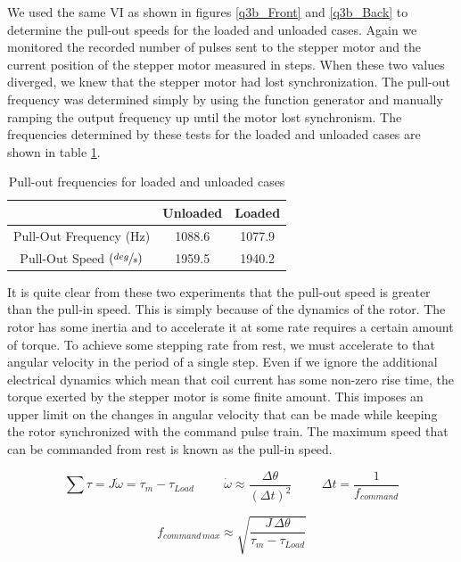 \documentclass{article}
\theoremstyle{plain}
\theoremstyle{definition}
\theoremstyle{remark}
\begin{document}
We used the same VI as shown in figures \ref{q3b_Front} and \ref{q3b_Back} to determine the pull-out speeds for the loaded and unloaded cases.  Again we monitored the recorded number of pulses sent to the stepper motor and the current position of the stepper motor measured in steps.   When these two values diverged, we knew that the stepper motor had lost synchronization.  The pull-out frequency was determined simply by using the function generator and manually ramping the output frequency up until the motor lost synchronism.  The frequencies determined by these tests for the loaded and unloaded cases are shown in table \ref{q3b_table2}.

\begin{table}
\begin{center}
    \begin{tabular}{|c|c|c|}
        \hline
        ~                       & Unloaded & Loaded \\ \hline
        Pull-Out Frequency (Hz) & 1088.6   & 1077.9 \\
	Pull-Out Speed $(\sfrac{deg}{s})$ & 1959.5 & 1940.2 \\
        \hline
    \end{tabular}
\caption{Pull-out frequencies for loaded and unloaded cases}
\label{q3b_table2}
\end{center}
\end{table}

It is quite clear from these two experiments that the pull-out speed is greater than the pull-in speed.  This is simply because of the dynamics of the rotor.  The rotor has some inertia and to accelerate it at some rate requires a certain amount of torque.  To achieve some stepping rate from rest, we must accelerate to that angular velocity in the period of a single step.   Even if we ignore the additional electrical dynamics which mean that coil current has some non-zero rise time, the torque exerted by the stepper motor is some finite amount.  This imposes an upper limit on the changes in angular velocity that can be made while keeping the rotor synchronized with the command pulse train.  The maximum speed that can be commanded from rest is known as the pull-in speed.

$$ \sum \tau = J \dot{\omega} = \tau_m - \tau_{Load} \hspace{1cm} \dot{\omega} \approx \frac{\Delta \theta}{(\Delta t)^2} \hspace{1cm} \Delta t = \frac{1}{f_{command}}$$

$$ f_{command \, max} \approx \sqrt{\frac{J \, \Delta \theta}{\tau_{m} - \tau_{Load}}} $$
\end{document}
